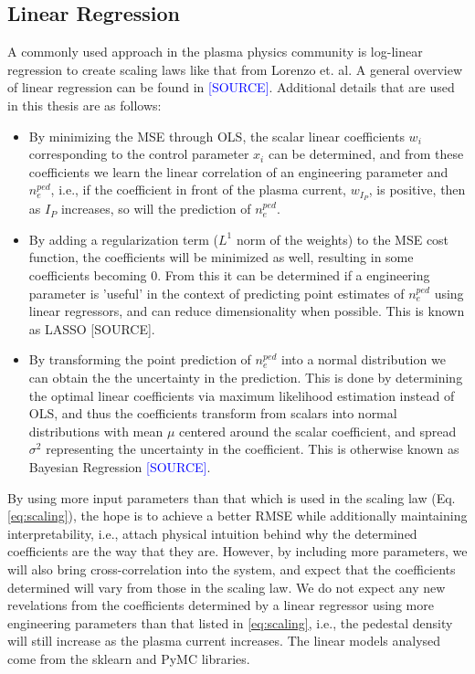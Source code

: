 \documentclass[a4paper, twoside, final, 12pt]{article}
\begin{document}
\subsection{Linear Regression}
A commonly used approach in the plasma physics community is log-linear regression to create scaling laws like that from Lorenzo et. al.
A general overview of linear regression can be found in \textcolor{blue}{[SOURCE]}. 
Additional details that are used in this thesis are as follows: 
\begin{itemize}
	\item By minimizing the MSE through OLS, the scalar linear coefficients $w_i$ corresponding to the control parameter $x_i$ can be determined, and from these coefficients we learn the linear correlation of an engineering parameter and $n_e^{ped}$, i.e., if the coefficient in front of the plasma current, $w_{I_P}$, is positive, then as $I_P$ increases, so will the prediction of $n_e^{ped}$.
	\item By adding a regularization term ($L^1$ norm of the weights) to the MSE cost function, the coefficients will be minimized as well, resulting in some coefficients becoming 0. From this it can be determined if a engineering parameter is 'useful' in the context of predicting point estimates of $n_e^{ped}$ using linear regressors, and can reduce dimensionality when possible. This is known as LASSO [SOURCE].
	\item By transforming the point prediction of $n_e^{ped}$  into a normal distribution we can obtain the the uncertainty in the prediction. This is done by determining the optimal linear coefficients via maximum likelihood estimation instead of OLS, and thus the coefficients transform from scalars into normal distributions with mean $\mu$ centered around the scalar coefficient, and spread $\sigma^2$ representing the uncertainty in the coefficient. This is otherwise known as Bayesian Regression \textcolor{blue}{[SOURCE]}.
\end{itemize}

By using more input parameters than that which is used in the scaling law (Eq. \ref{eq:scaling}), the hope is to achieve a better RMSE while additionally maintaining interpretability, i.e., attach physical intuition behind why the determined coefficients are the way that they are. However, by including more parameters, we will also bring cross-correlation into the system, and expect that the coefficients determined will vary from those in the scaling law. We do not expect any new revelations from the coefficients determined by a linear regressor using more engineering parameters than that listed in \ref{eq:scaling}, i.e., the pedestal density will still increase as the plasma current increases.  The linear models analysed come from the sklearn and PyMC libraries. 
\end{document}

